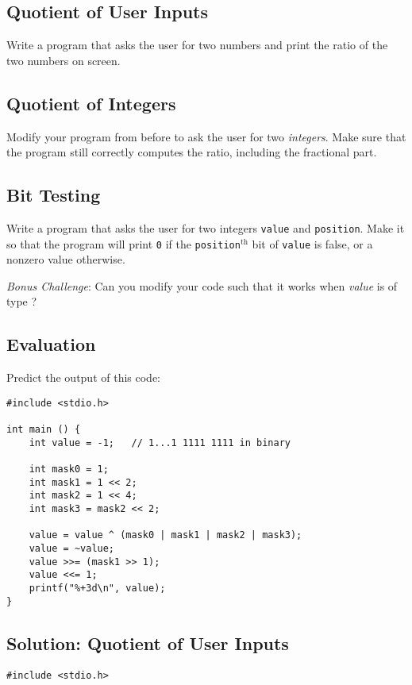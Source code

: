 {\subsection*{Quotient of User Inputs}
Write a program that asks the user for two numbers and print the ratio of the two numbers on screen.

\subsection*{Quotient of Integers}
Modify your program from before to ask the user for two \emph{integers}. Make sure that the program still correctly computes the ratio, including the fractional part.

\subsection*{Bit Testing}
Write a program that asks the user for two integers \texttt{value} and \texttt{position}. Make it so that the program will print \texttt{0} if the \texttt{position}$^\text{th}$ bit of \texttt{value} is false, or a nonzero value otherwise.

\emph{Bonus Challenge}: Can you modify your code such that it works when \emph{value} is of type ?

\subsection*{Evaluation}
Predict the output of this code:
\begin{codebox}[exo4-4.c]
\begin{verbatim}
#include <stdio.h>

int main () {
    int value = -1;   // 1...1 1111 1111 in binary

    int mask0 = 1;
    int mask1 = 1 << 2;
    int mask2 = 1 << 4;
    int mask3 = mask2 << 2;

    value = value ^ (mask0 | mask1 | mask2 | mask3);
    value = ~value;
    value >>= (mask1 >> 1);
    value <<= 1;
    printf("%+3d\n", value);
}
\end{verbatim}
\end{codebox}


\newpage


\subsection*{Solution: Quotient of User Inputs}
\begin{codebox}[exo4-1.c]
\begin{verbatim}
#include <stdio.h>


\end{verbatim}
\end{codebox}}
